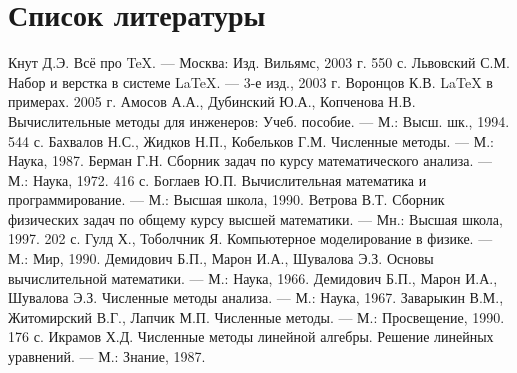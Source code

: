 \documentclass[12pt,a4paper]{scrartcl}
\begin{document}
\section{Список литературы}
\label{sec:literature}
\begin{thebibliography}{}
 Кнут Д.Э. Всё про \TeX. --- Москва: Изд. Вильямс, 2003 г. 550 с.
 Львовский С.М. Набор и верстка в системе \LaTeX{}. --- 3-е изд., 2003 г.
 Воронцов К.В. \LaTeX{} в примерах. 2005 г.
 Амосов А.А., Дубинский Ю.А., Копченова Н.В. Вычислительные методы для инженеров: Учеб. пособие. --- М.: Высш. шк., 1994. 544 с.
 Бахвалов Н.С., Жидков Н.П., Кобельков Г.М. Численные методы. --- М.: Наука, 1987.
 Берман Г.Н. Сборник задач по курсу математического анализа. --- М.: Наука, 1972. 416 с.
 Боглаев Ю.П. Вычислительная математика и программирование. --- М.: Высшая школа, 1990.
 Ветрова В.Т. Сборник физических задач по общему курсу высшей математики. --- Мн.: Высшая школа, 1997. 202 с.
 Гулд Х., Тоболчник Я. Компьютерное моделирование в физике. --- М.: Мир, 1990.
 Демидович Б.П., Марон И.А., Шувалова Э.З. Основы вычислительной математики. --- М.: Наука, 1966.
 Демидович Б.П., Марон И.А., Шувалова Э.З. Численные методы анализа. --- М.: Наука, 1967.
 Заварыкин В.М., Житомирский В.Г., Лапчик М.П. Численные методы. --- М.: Просвещение, 1990. 176 с.
 Икрамов Х.Д. Численные методы линейной алгебры. Решение линейных уравнений. --- М.: Знание, 1987.
\end{thebibliography}
\end{document}
